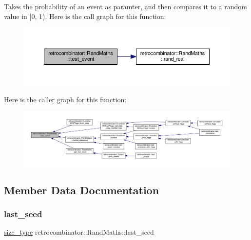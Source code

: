 Takes the probability of an event as paramter, and then compares it to a random value in \mbox{[}0, 1). Here is the call graph for this function\+:
\nopagebreak
\begin{figure}[H]
\begin{center}
\leavevmode
\includegraphics[width=350pt]{classretrocombinator_1_1RandMaths_a183686140a9da18ad40c7e048ee8914e_cgraph}
\end{center}
\end{figure}
Here is the caller graph for this function\+:
\nopagebreak
\begin{figure}[H]
\begin{center}
\leavevmode
\includegraphics[width=350pt]{classretrocombinator_1_1RandMaths_a183686140a9da18ad40c7e048ee8914e_icgraph}
\end{center}
\end{figure}


\subsection{Member Data Documentation}
\mbox{\label{classretrocombinator_1_1RandMaths_ab5b6bec8e0eaea80efe565cddc8e69ac}} 
\subsubsection{\texorpdfstring{last\+\_\+seed}{last\_seed}}
{\footnotesize\ttfamily \hyperlink{namespaceretrocombinator_a8e1541b50cee66a791df4c437ccbb385}{size\+\_\+type} retrocombinator\+::\+Rand\+Maths\+::last\+\_\+seed\hspace{0.3cm}{\ttfamily [private]}}



